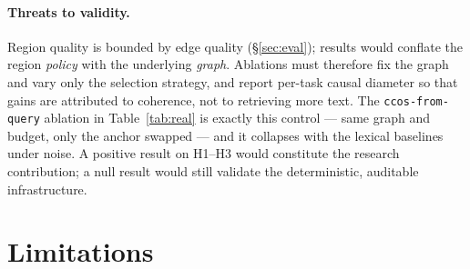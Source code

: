 \documentclass[11pt]{article}
\newcommand{\code}[1]{\texttt{#1}}
\begin{document}
\paragraph{Threats to validity.} Region quality is bounded by edge quality
(\S\ref{sec:eval}); results would conflate the region \emph{policy} with the
underlying \emph{graph}. Ablations must therefore fix the graph and vary only the
selection strategy, and report per-task causal diameter so that gains are
attributed to coherence, not to retrieving more text. The \code{ccos-from-query}
ablation in Table~\ref{tab:real} is exactly this control --- same graph and
budget, only the anchor swapped --- and it collapses with the lexical baselines
under noise. A positive result on H1--H3 would constitute the research
contribution; a null result would still validate the deterministic, auditable
infrastructure.

\section{Limitations}
\end{document}
